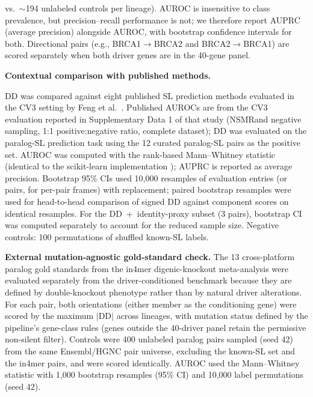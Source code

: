 \documentclass[11pt,a4paper]{article}
\begin{document}
vs.\ $\sim$194 unlabeled controls per lineage). AUROC is insensitive to class prevalence, but precision--recall performance is not; we therefore report AUPRC (average precision) alongside AUROC, with bootstrap confidence intervals for both. Directional pairs (e.g., BRCA1$\rightarrow$BRCA2 and BRCA2$\rightarrow$BRCA1) are scored separately when both driver genes are in the 40-gene panel.

\textbf{Contextual comparison with published methods.}

DD was compared against eight published SL prediction methods evaluated in the CV3 setting by Feng et al.\ \cite{Feng2024}. Published AUROCs are from the CV3 evaluation reported in Supplementary Data 1 of that study (NSMRand negative sampling, 1:1 positive:negative ratio, complete dataset); DD was evaluated on the paralog-SL prediction task using the 12 curated paralog-SL pairs as the positive set. AUROC was computed with the rank-based Mann--Whitney statistic (identical to the scikit-learn implementation \cite{Pedregosa2011}); AUPRC is reported as average precision. Bootstrap 95\% CIs used 10,000 resamples of evaluation entries (or pairs, for per-pair frames) with replacement; paired bootstrap resamples were used for head-to-head comparison of signed DD against component scores on identical resamples. For the DD~+~identity-proxy subset (3 pairs), bootstrap CI was computed separately to account for the reduced sample size. Negative controls: 100 permutations of shuffled known-SL labels.

\textbf{External mutation-agnostic gold-standard check.} The 13 cross-platform paralog gold standards from the in4mer digenic-knockout meta-analysis \cite{EsmaeiliAnvar2024} were evaluated separately from the driver-conditioned benchmark because they are defined by double-knockout phenotype rather than by natural driver alterations. For each pair, both orientations (either member as the conditioning gene) were scored by the maximum $|$DD$|$ across lineages, with mutation status defined by the pipeline's gene-class rules (genes outside the 40-driver panel retain the permissive non-silent filter). Controls were 400 unlabeled paralog pairs sampled (seed 42) from the same Ensembl/HGNC pair universe, excluding the known-SL set and the in4mer pairs, and were scored identically. AUROC used the Mann--Whitney statistic with 1{,}000 bootstrap resamples (95\% CI) and 10{,}000 label permutations (seed 42).
\end{document}
